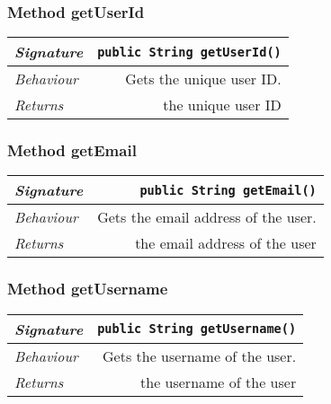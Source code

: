 \begin{adjustwidth}{1.5em}{0pt}
\begin{adjustwidth}{1.5em}{0pt}
\begin{adjustwidth}{1.5em}{0pt}
{\begin{tabularx}{1.0\linewidth}{@{}l R@{}}
      \end{tabularx}}
    \end{adjustwidth}\subsubsection{Method getUserId\label{edu.kit.hci.soli.domain.User@getUserId()}}
    \begin{adjustwidth}{1.5em}{0pt}
      {\begin{tabularx}{1.0\linewidth}{@{}l R@{}}
        \emph{Signature} & \texttt{public \texttt{String} getUserId()} \\
        \hline
        \emph{Behaviour} & Gets the unique user ID.    \\
        \hline
        \emph{Returns} & the unique user ID  \\
        \hline
  
      \end{tabularx}}
    \end{adjustwidth}\subsubsection{Method getEmail\label{edu.kit.hci.soli.domain.User@getEmail()}}
    \begin{adjustwidth}{1.5em}{0pt}
      {\begin{tabularx}{1.0\linewidth}{@{}l R@{}}
        \emph{Signature} & \texttt{public \texttt{String} getEmail()} \\
        \hline
        \emph{Behaviour} & Gets the email address of the user.    \\
        \hline
        \emph{Returns} & the email address of the user  \\
        \hline
  
      \end{tabularx}}
    \end{adjustwidth}\subsubsection{Method getUsername\label{edu.kit.hci.soli.domain.User@getUsername()}}
    \begin{adjustwidth}{1.5em}{0pt}
      {\begin{tabularx}{1.0\linewidth}{@{}l R@{}}
        \emph{Signature} & \texttt{public \texttt{String} getUsername()} \\
        \hline
        \emph{Behaviour} & Gets the username of the user.    \\
        \hline
        \emph{Returns} & the username of the user  \\
        \hline
  

\end{tabularx}}
\end{adjustwidth}
\end{adjustwidth}
\end{adjustwidth}
